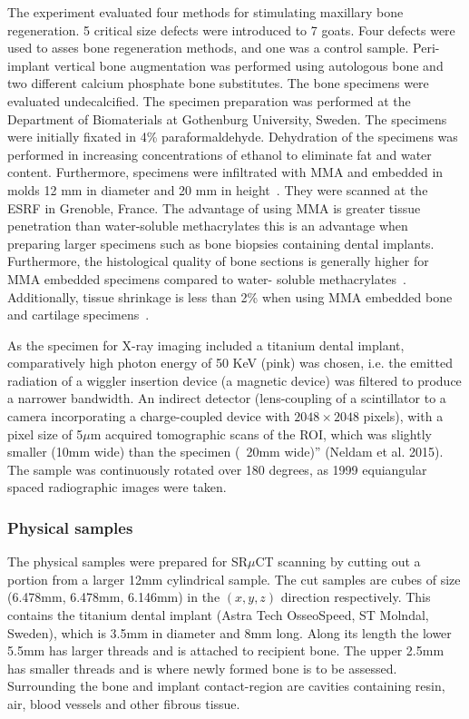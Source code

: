 The experiment evaluated four methods for stimulating maxillary bone regeneration.
5 critical size defects were introduced to 7 goats.
 Four defects were used to asses bone regeneration methods, and one was a control sample.
 Peri-implant vertical bone augmentation was performed using autologous bone and two different
 calcium phosphate bone substitutes. The bone specimens were evaluated undecalcified. The
 specimen preparation was performed at the Department of Biomaterials at Gothenburg University,
 Sweden. The specimens were initially fixated in 4\% paraformaldehyde. Dehydration of the
 specimens was performed in increasing concentrations of ethanol to eliminate fat and water
 content. Furthermore, specimens were infiltrated with MMA and embedded in molds 12 mm in
 diameter and 20 mm in height~\cite{donath1982,donath1993,erben1997}. They were scanned at the ESRF
 in Grenoble, France. The advantage of using MMA is greater tissue penetration than water-soluble
 methacrylates this is an advantage when preparing larger specimens such as bone biopsies
 containing dental implants. Furthermore, the histological quality of bone sections is generally
 higher for MMA embedded specimens compared to water- soluble methacrylates~\cite{erben1997}.
 Additionally, tissue shrinkage is less than 2\% when using MMA embedded bone and cartilage
 specimens~\cite{ferguson1999}.

As the specimen for X-ray imaging included a titanium dental implant, comparatively high photon
 energy of 50 KeV (pink) was chosen, i.e. the
 emitted radiation of a wiggler insertion device (a
 magnetic device) was filtered    to produce a narrower bandwidth. An indirect detector (lens-coupling
 of a scintillator to a camera incorporating a charge-coupled device with $2048 \times 2048$ pixels),
 with a pixel size of 5$\mu$m acquired tomographic scans of the ROI, which was slightly smaller (10mm wide)
 than the specimen (~20mm wide)” (Neldam et al. 2015). The sample was continuously rotated over
 180 degrees, as 1999 equiangular spaced radiographic images were taken.

\subsubsection{Physical samples}

The physical samples were prepared for SR$\mu$CT scanning by cutting out a portion from a larger
12mm cylindrical sample. The cut samples are cubes of size (6.478mm, 6.478mm, 6.146mm) in the
$(x,y,z)$ direction respectively. This contains the titanium dental implant (Astra Tech OsseoSpeed,
ST Molndal, Sweden), which is 3.5mm in diameter and 8mm long. Along its length the lower 5.5mm
has larger threads and is attached to recipient bone. The upper 2.5mm has smaller threads and
is where newly formed bone is to be assessed. Surrounding the bone and implant contact-region
are cavities containing resin, air, blood vessels and other fibrous tissue.

